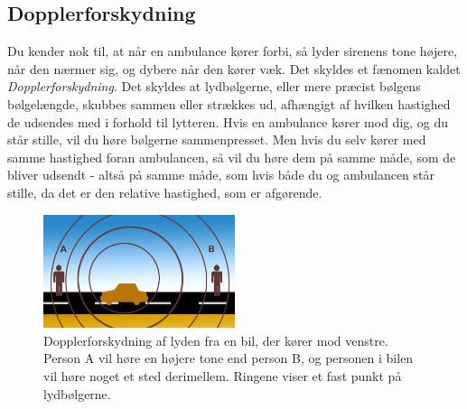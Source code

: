 \subsection{Dopplerforskydning}
Du kender nok til, at når en ambulance kører forbi, så lyder sirenens tone højere, når den nærmer sig, og dybere når den kører væk. Det skyldes et fænomen kaldet \emph{Dopplerforskydning}. %
Det skyldes at lydbølgerne, eller mere præcist bølgens bølgelængde, skubbes sammen eller strækkes ud, afhængigt af hvilken hastighed de udsendes med i forhold til lytteren. Hvis en ambulance kører mod dig, og du står stille, vil du høre bølgerne sammenpresset. Men hvis du selv kører med samme hastighed foran ambulancen, så vil du høre dem på samme måde, som de bliver udsendt - altså på samme måde, som hvis både du og ambulancen står stille, da det er den relative hastighed, som er afgørende.
\begin{figure}[h!]
	\centering
	\includegraphics[width=0.5\textwidth]{Astrofysik/billeder/doppler.jpg}
	\caption{Dopplerforskydning af lyden fra en bil, der kører mod venstre. Person A vil høre en højere tone end person B, og personen i bilen vil høre noget et sted derimellem. Ringene viser et fast punkt på lydbølgerne.} %
	\label{doppler}
\end{figure}

